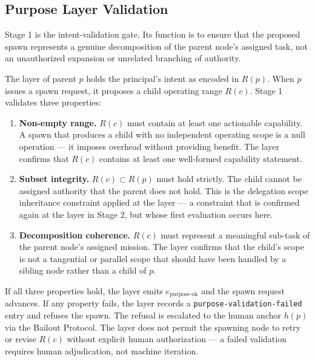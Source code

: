 \subsection{Purpose Layer Validation}
\label{sec:rsp-purpose-validation}

Stage 1 is the intent-validation gate. Its function is to ensure that the proposed spawn represents a genuine decomposition of the parent node's assigned task, not an unauthorized expansion or unrelated branching of authority.

The \purpose{} layer of parent $p$ holds the principal's intent as encoded in $R(p)$. When $p$ issues a spawn request, it proposes a child operating range $R(c)$. Stage 1 validates three properties:

\begin{enumerate}
\item[{(a)}] \textbf{Non-empty range.} $R(c)$ must contain at least one actionable capability. A spawn that produces a child with no independent operating scope is a null operation — it imposes overhead without providing benefit. The \purpose{} layer confirms that $R(c)$ contains at least one well-formed capability statement.

\item[{(b)}] \textbf{Subset integrity.} $R(c) \subset R(p)$ must hold strictly. The child cannot be assigned authority that the parent does not hold. This is the delegation scope inheritance constraint applied at the \purpose{} layer — a constraint that is confirmed again at the \bounds{} layer in Stage 2, but whose first evaluation occurs here.

\item[{(c)}] \textbf{Decomposition coherence.} $R(c)$ must represent a meaningful sub-task of the parent node's assigned mission. The \purpose{} layer confirms that the child's scope is not a tangential or parallel scope that should have been handled by a sibling node rather than a child of $p$.
\end{enumerate}

If all three properties hold, the \purpose{} layer emits $e_{\text{purpose-ok}}$ and the spawn request advances. If any property fails, the \purpose{} layer records a \texttt{purpose-validation-failed} entry and refuses the spawn. The refusal is escalated to the human anchor $h(p)$ via the Bailout Protocol. The \purpose{} layer does not permit the spawning node to retry or revise $R(c)$ without explicit human authorization — a failed validation requires human adjudication, not machine iteration.

